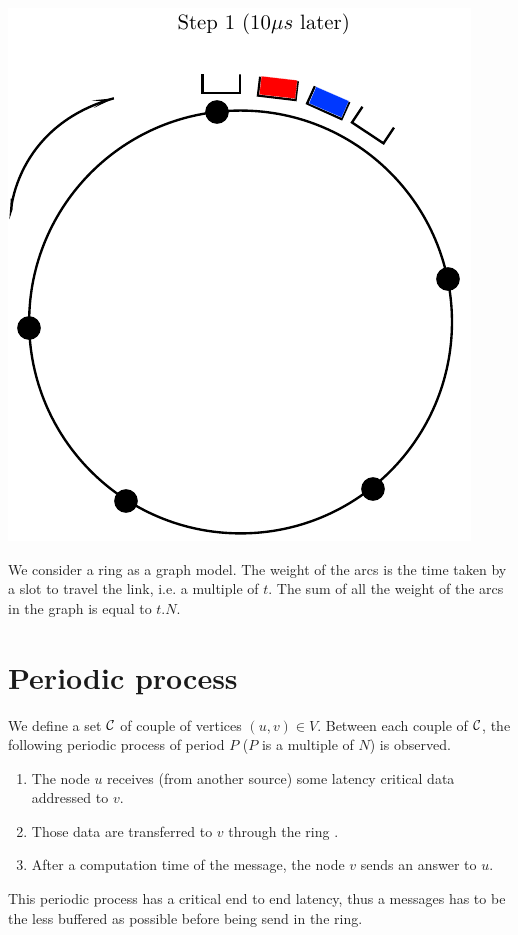 \documentclass[a4paper,10pt]{article}
\begin{document}
\begin{center}
      \includegraphics[scale=0.5]{anneau2.pdf}
  
\end{center}

We consider a ring as a graph model. The weight of the arcs is the time taken by a slot to travel the link, i.e. a multiple of $t$. The sum of all the weight of the arcs in the graph is equal to $t.N$.

\section*{Periodic process}
We define a set $\cal C$ of couple of vertices $(u,v) \in V$. Between each couple of $\cal C$, the following periodic process of period $P$ ($P$ is a multiple of $N$) is observed.
\begin{enumerate}
 \item The node $u$ receives (from another source) some latency critical data addressed to $v$.
 \item Those data are transferred to $v$ through the ring .
 \item After a computation time of the message, the node $v$ sends an answer to $u$.
\end{enumerate}
 This periodic process has a critical end to end latency, thus a messages has to be the less buffered as possible before being send in the ring.
 
\end{document}
